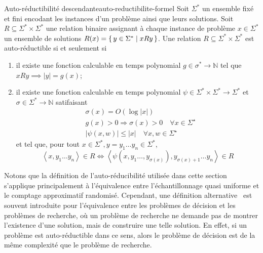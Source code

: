 \begin{maindefinition}{Auto-réductibilité descendante}{auto-reductibilite-formel}
    Soit $\Sigma^{*}$ un ensemble fixé et fini encodant les instances d'un problème ainsi que leurs solutions. Soit $R \subseteq \Sigma^{*} \times \Sigma^{*}$ une relation binaire assignant à chaque instance de problème $x \in \Sigma^{*}$ un ensemble de solutions $R(x) = \set{ y \in \Sigma^{*} \mid xRy }$. Une relation $R \subseteq \Sigma^{*} \times \Sigma^{*}$ est auto-réductible si et seulement si
    \begin{enumerate}
        \item il existe une fonction calculable en temps polynomial $g \in \sigma^{*} \to \mathbb{N}$ tel que $xRy \implies \lvert y \rvert = g(x)$;
        \item il existe une fonction calculable en temps polynomial $\psi \in \Sigma^{*} \times \Sigma^{*} \to \Sigma^{*}$ et $\sigma \in \Sigma^{*} \to \mathbb{N}$ satifaisant
        \begin{align*}
            & \sigma(x)=O(\log |x|) \\
            & g(x)>0 \Rightarrow \sigma(x)>0 \quad \forall x \in \Sigma^{\star} \\
            & |\psi(x, w)| \leqslant|x| \quad \forall x, w \in \Sigma^{\star}
        \end{align*}
        et tel que, pour tout $x \in \Sigma^{*}, y=y_1 \ldots y_n \in \Sigma^{*}$, 
        \begin{equation*}
            \left\langle x, y_1 \ldots y_n \right\rangle \in R \Leftrightarrow \left\langle \psi \left( x, y_1 \ldots, y_{\sigma(x)} \right), y_{\sigma(x)+1} \ldots y_n \right\rangle \in R
        \end{equation*}
    \end{enumerate}
\end{maindefinition}

Notons que la définition de l'auto-réducibilité utilisée dans cette section s'applique principalement à l'équivalence entre l'échantillonnage quasi uniforme et le comptage approximatif randomisé. Cependant, une définition alternative~\cite{goldreichComputationalComplexityConceptual2008a} est souvent introduite pour l'équivalence entre les problèmes de décision et les problèmes de recherche, où un problème de recherche ne demande pas de montrer l'existence d'une solution, mais de construire une telle solution. En effet, si un problème est auto-réductible dans ce sens, alors le problème de décision est de la même complexité que le problème de recherche. 

